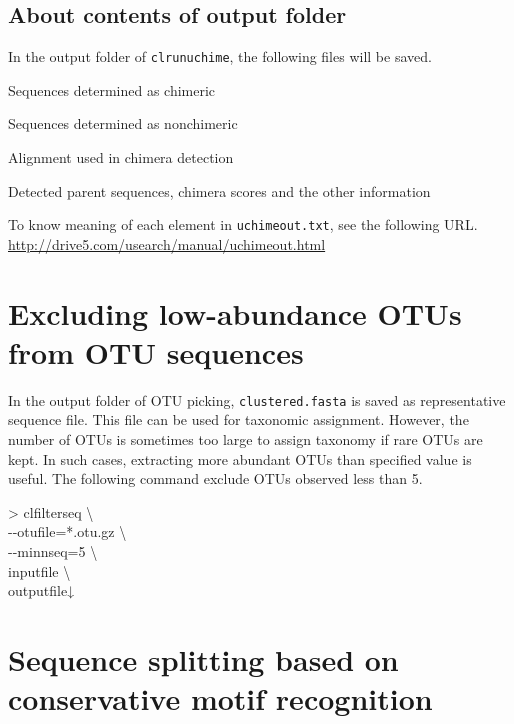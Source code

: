 \documentclass[titlepage,10pt,a4paper,english]{jsbook}
\newenvironment{cmd}{\begin{oframed}\raggedright\ttfamily\footnotesize\setlength{\baselineskip}{1.4em}}{\end{oframed}\vspace{-1em}}
\begin{document}
\subsection{About contents of output folder}

In the output folder of \texttt{clrunuchime}, the following files will be saved.

\begin{description}\small\setlength{\baselineskip}{1.1em}
\item[chimeras.fasta] Sequences determined as chimeric
\item[nonchimeras.fasta] Sequences determined as nonchimeric
\item[uchimealns.txt] Alignment used in chimera detection
\item[uchimeout.txt] Detected parent sequences, chimera scores and the other information
\end{description}

To know meaning of each element in \texttt{uchimeout.txt}, see the following URL.\\
\href{http://drive5.com/usearch/manual/uchimeout.html}{http://drive5.com/usearch/manual/uchimeout.html}

\section{Excluding low-abundance OTUs from OTU sequences}

In the output folder of OTU picking, \texttt{clustered.fasta} is saved as representative sequence file.
This file can be used for taxonomic assignment.
However, the number of OTUs is sometimes too large to assign taxonomy if rare OTUs are kept.
In such cases, extracting more abundant OTUs than specified value is useful.
The following command exclude OTUs observed less than 5.

\begin{cmd}
{\textgreater} clfilterseq {\textbackslash}\\
{-}{-}otufile=*.otu.gz {\textbackslash}\\
{-}{-}minnseq=5 {\textbackslash}\\
inputfile {\textbackslash}\\
outputfile↓
\end{cmd}

\section{Sequence splitting based on conservative motif recognition}
\end{document}
